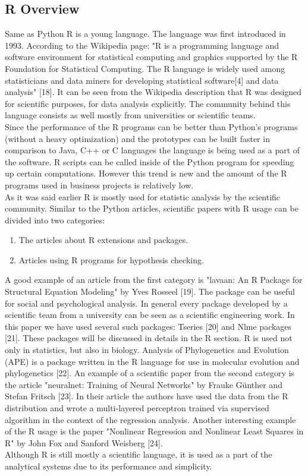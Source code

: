\documentclass [twoside,
  11pt, a4paper,
  footinclude=true,
  headinclude=true,
  cleardoublepage=empty
]{article}
\begin{document}
\subsection{R Overview}
Same as Python R is a young language. The language was first introduced in 1993. According to the Wikipedia page: "R is a programming language and software environment for statistical computing and graphics supported by the R Foundation for Statistical Computing. The R language is widely used among statisticians and data miners for developing statistical software[4] and data analysis" [18]. It can be seen from the Wikipedia description that R was designed for scientific purposes, for data analysis explicitly. The community behind this language consists as well mostly from universities or scientific teams. \\
Since the performance of the R programs can be better than Python's programs (without a heavy optimization) and the prototypes can be built faster in comparison to Java, C++ or C languages the language is being used as a part of the software. R scripts can be called inside of the Python program for speeding up certain computations. However this trend is new and the amount of the R programs used in business projects is relatively low.\\
As it was said earlier R is mostly used for statistic analysis by the scientific community. Similar to the Python articles, scientific papers with R usage can be divided into two categories:
\begin{enumerate}
    \item The articles about R extensions and packages.
    \item Articles using R programs for hypothesis checking.
\end{enumerate}
A good example of an article from the first category is "lavaan: An R Package for Structural Equation Modeling" by Yves Rosseel [19]. The package can be useful for social and psychological analysis. In general every package developed by a scientific team from a university can be seen as a scientific engineering work. In this paper we have used several such packages: Tseries [20] and Nlme packages [21]. These packages will be discussed in details in the R section. R is used not only in statistics, but also in biology. Analysis of Phylogenetics and Evolution (APE) is a package written in the R language for use in molecular evolution and phylogenetics [22].
An example of a scientific paper from the second category is the article "neuralnet: Training of Neural Networks" by Frauke Günther and Stefan Fritsch [23]. In their article the authors have used the data from the R distribution and wrote a multi-layered perceptron trained via supervised algorithm in the context of the regression analysis. Another interesting example of the R usage is the paper "Nonlinear Regression and Nonlinear Least Squares in R" by John Fox and Sanford Weisberg [24]. \\
Although R is still mostly a scientific language, it is used as a part of the analytical systems due to its performance and simplicity.
\end{document}
